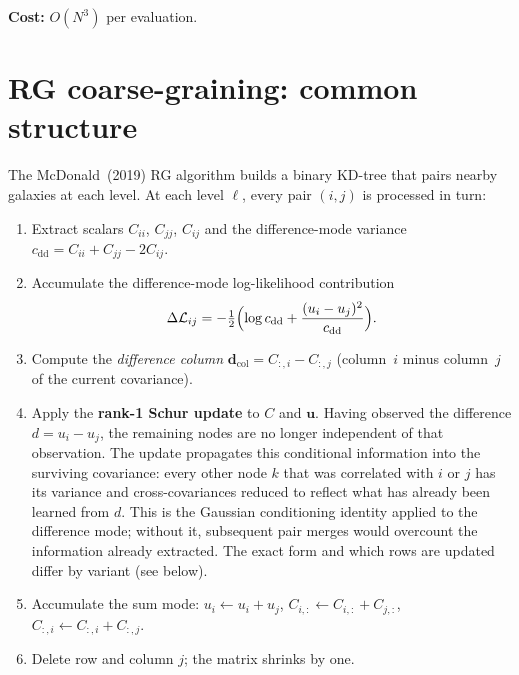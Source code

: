 \documentclass[11pt]{article}
\begin{document}
\noindent\textbf{Cost:} $O(N^3)$ per evaluation.

\section{RG coarse-graining: common structure}

The McDonald~(2019) RG algorithm builds a binary KD-tree that pairs
nearby galaxies at each level.
At each level $\ell$, every pair $(i,j)$ is processed in turn:

\begin{enumerate}
  \item Extract scalars $C_{ii}$, $C_{jj}$, $C_{ij}$ and the
        difference-mode variance
        $c_\mathrm{dd} = C_{ii} + C_{jj} - 2C_{ij}$.
  \item Accumulate the difference-mode log-likelihood contribution
        \begin{equation}
          \Delta\mathcal{L}_{ij}
          = -\tfrac{1}{2}\Bigl(\log c_\mathrm{dd}
            + \frac{(u_i - u_j)^2}{c_\mathrm{dd}}\Bigr).
        \end{equation}
  \item Compute the \emph{difference column}
        $\mathbf{d}_\mathrm{col} = C_{:,i} - C_{:,j}$
        (column~$i$ minus column~$j$ of the current covariance).
  \item Apply the \textbf{rank-1 Schur update} to $C$ and $\mathbf{u}$.
        Having observed the difference $d = u_i - u_j$, the remaining
        nodes are no longer independent of that observation.
        The update propagates this conditional information into the
        surviving covariance: every other node $k$ that was correlated
        with $i$ or $j$ has its variance and cross-covariances reduced
        to reflect what has already been learned from $d$.
        This is the Gaussian conditioning identity applied to the
        difference mode; without it, subsequent pair merges would
        overcount the information already extracted.
        The exact form and which rows are updated differ by variant
        (see below).
  \item Accumulate the sum mode:
        $u_i \leftarrow u_i + u_j$,\;
        $C_{i,:} \leftarrow C_{i,:} + C_{j,:}$,\;
        $C_{:,i} \leftarrow C_{:,i} + C_{:,j}$.
  \item Delete row and column $j$; the matrix shrinks by one.
\end{enumerate}
\end{document}
